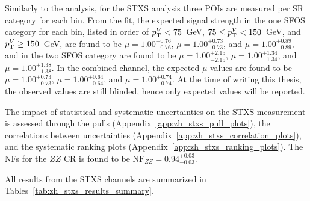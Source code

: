 Similarly to the \wh{} analysis, for the \zh{} STXS analysis three POIs are measured per SR category for each \ptv{} bin. From the fit, the expected signal strength in the one SFOS category for each \ptv{} bin, listed in order of $p_{\mathrm{T}}^{V} < 75$~GeV, $75 \leq p_{\mathrm{T}}^{V} < 150$~GeV, and $p_{\mathrm{T}}^{V} \geq 150$~GeV, are found to be $\mu = 1.00^{+0.76}_{-0.76}$, $\mu = 1.00^{+0.73}_{-0.73}$, and $\mu = 1.00^{+0.89}_{-0.89}$, and in the two SFOS category are found to be $\mu = 1.00^{+2.15}_{-2.15}$, $\mu = 1.00^{+1.34}_{-1.34}$, and $\mu = 1.00^{+1.38}_{-1.38}$. In the combined \zh{} channel, the expected $\mu$ values are found to be $\mu = 1.00^{+0.73}_{-0.73}$, $\mu = 1.00^{+0.64}_{-0.64}$, and $\mu = 1.00^{+0.74}_{-0.74}$. At the time of writing this thesis, the observed values are still blinded, hence only expected values will be reported.

The impact of statistical and systematic uncertainties on the STXS \zh{} measurement is assessed through the pulls (Appendix~\ref{app:zh_stxs_pull_plots}), the correlations between uncertainties (Appendix~\ref{app:zh_stxs_correlation_plots}), and the systematic ranking plots (Appendix~\ref{app:zh_stxs_ranking_plots}). The NFs for the $ZZ$ CR is found to be $\mathrm{NF}_{ZZ} = 0.94^{+0.03}_{-0.03}$.



All results from the \zh{} STXS channels are summarized in Tables~\ref{tab:zh_stxs_results_summary}.

